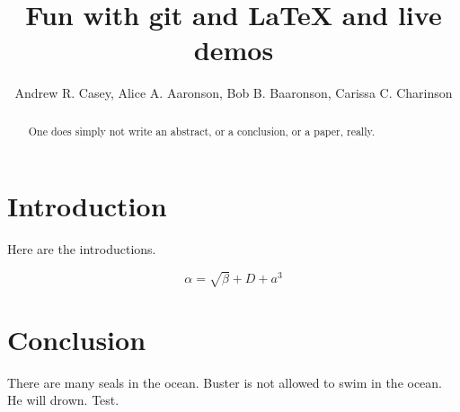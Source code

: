 \documentclass{article}
\begin{document}
\title{Fun with git and \LaTeX{} and live demos}
\author{Andrew R. Casey, Alice A. Aaronson, Bob B. Baaronson, Carissa C. Charinson}

\maketitle

\begin{abstract}
One does simply not write an abstract, or a conclusion, or a paper, really.
\end{abstract}

\section{Introduction}
Here are the introductions.

\begin{equation}
    \label{simple_equation}
    \alpha = \sqrt{ \beta } + D + a^3
\end{equation}


\section{Conclusion}
There are many seals in the ocean. Buster is not allowed to swim in the ocean. He will drown.
Test.
\end{document}
